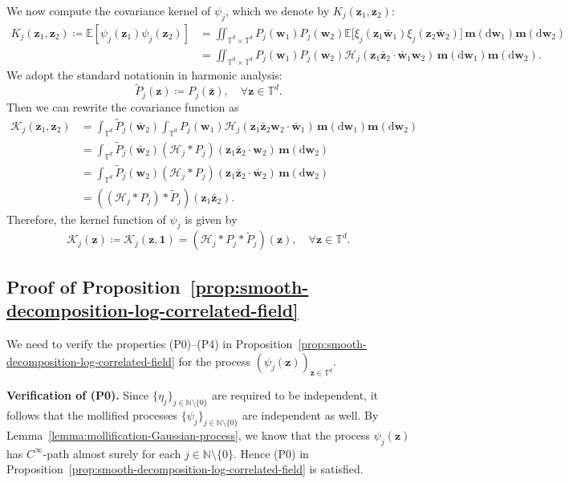 \documentclass[12pt]{amsart}
\theoremstyle{definition}
\theoremstyle{remark}
\newcommand{\bz}{\boldsymbol{z}}
\newcommand{\bw}{\boldsymbol{w}}
\newcommand{\N}{\mathbb{N}}
\newcommand{\E}{\mathbb{E}}
\newcommand{\T}{\mathbb{T}}
\numberwithin{equation}{section}
\begin{document}
We now compute the covariance kernel of $\psi_j$, which we denote by $K_j(\bz_1, \bz_2)$: 
\begin{align*}
K_j(\bz_1,\bz_2)\coloneq \E[\psi_j(\bz_1)\psi_j(\bz_2)]&=\iint_{\T^d\times \T^d} P_j(\bw_1)P_j(\bw_2)\E\big[\xi_j(\bz_1\bar{\bw}_1)\xi_j(\bz_2\bar{\bw}_2)\big]\,\boldsymbol{m}(\mathrm{d}\bw_1)\boldsymbol{m}(\mathrm{d}\bw_2)\\
&=\iint_{\T^d\times \T^d} P_j(\bw_1)P_j(\bw_2)\mathcal{H}_j(\bz_1\bar{\bz}_2\cdot \bar{\bw}_1\bw_2)\,\boldsymbol{m}(\mathrm{d}\bw_1)\boldsymbol{m}(\mathrm{d}\bw_2).
\end{align*}
We adopt the standard notationin in harmonic analysis:
\[
\widetilde{P}_j(\bz)\coloneq P_j(\bar{\bz}),\quad \forall \bz\in \T^d.
\]
Then we can rewrite the covariance function as
\begin{align*}
\mathcal{K}_j(\bz_1,\bz_2)&=\int_{\T^d}\widetilde{P}_j(\bar{\bw}_2)\int_{\T^d}P_j(\bw_1)\mathcal{H}_j(\bz_1\bar{\bz}_2\bw_2\cdot \bar{\bw}_1)\,\boldsymbol{m}(\mathrm{d}\bw_1)\boldsymbol{m}(\mathrm{d}\bw_2)\\
&=\int_{\T^d} \widetilde{P}_j(\bar{\bw}_2)(\mathcal{H}_j*P_j)(\bz_1\bar{\bz}_2\cdot \bw_2)\,\boldsymbol{m}(\mathrm{d}\bw_2)\\
&=\int_{\T^d} \widetilde{P}_j(\bw_2)(\mathcal{H}_j*P_j)(\bz_1\bar{\bz}_2\cdot \bar{\bw}_2)\,\boldsymbol{m}(\mathrm{d}\bw_2)\\
&=((\mathcal{H}_j*P_j)*\widetilde{P}_j)(\bz_1\bar{\bz}_2).
\end{align*}
Therefore, the kernel function of $\psi_j$ is given by
\begin{equation}\label{eq:def-Kj}
\mathcal{K}_j(\bz)\coloneq \mathcal{K}_j(\bz,\boldsymbol{1})=(\mathcal{H}_j*P_j*\widetilde{P}_j)(\bz),\quad \forall \bz\in \T^d.
\end{equation}


\subsection{Proof of Proposition~\ref{prop:smooth-decomposition-log-correlated-field}}

We need to verify the properties (P0)--(P4) in Proposition~\ref{prop:smooth-decomposition-log-correlated-field} for the process $(\psi_j(\bz))_{\bz\in \T^d}$.

\medskip
{\flushleft \bf Verification of (P0).} Since $\{\eta_j\}_{j\in \N\setminus\{0\}}$ are required to be independent, it follows that the mollified processes $\{\psi_j\}_{j\in \N\setminus\{0\}}$ are independent as well. By Lemma~\ref{lemma:mollification-Gaussian-process}, we know that the process $\psi_j(\bz)$ has $C^\infty$-path almost surely for each $j\in \N\setminus\{0\}$. Hence (P0) in Proposition~\ref{prop:smooth-decomposition-log-correlated-field} is satisfied.
\end{document}
